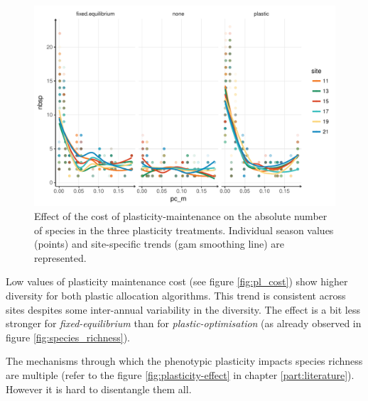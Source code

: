 \begin{figure}%
    \includegraphics[width=1\linewidth]{./2_PP/Figures/Comm/comm_n_sp_pc_m.pdf}%
  \caption[Maintenance plasticity cost effect on species richness]{Effect of the cost of plasticity-maintenance on the absolute number of species in the three plasticity treatments. Individual season values (points) and site-specific trends (gam smoothing line) are represented.}
  \label{fg:pl_cost}
\end{figure}

Low values of plasticity maintenance cost (see figure \ref{fig:pl_cost}) show higher diversity for both plastic allocation algorithms. This trend is consistent across sites despites some inter-annual variability in the diversity. The effect is a bit less stronger for \textit{fixed-equilibrium} than for \textit{plastic-optimisation} (as already observed in figure \ref{fig:species_richness}).



The mechanisms through which the phenotypic plasticity impacts species richness are multiple (refer to the figure \ref{fig:plasticity-effect} in chapter \ref{part:literature}). However it is hard to disentangle them all.

